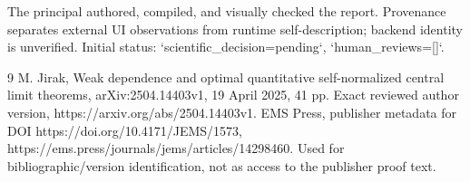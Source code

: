 \documentclass[10pt]{article}
\begin{document}
The principal authored, compiled, and visually checked the report. Provenance separates external UI observations from runtime self-description; backend identity is unverified. Initial status: `scientific\_decision=pending`, `human\_reviews=[]`.\par
9 M. Jirak, Weak dependence and optimal quantitative self-normalized central limit theorems, arXiv:2504.14403v1, 19 April 2025, 41 pp. Exact reviewed author version, https://arxiv.org/abs/2504.14403v1. EMS Press, publisher metadata for DOI https://doi.org/10.4171/JEMS/1573, https://ems.press/journals/jems/articles/14298460. Used for bibliographic/version identification, not as access to the publisher proof text.\par
\end{document}
